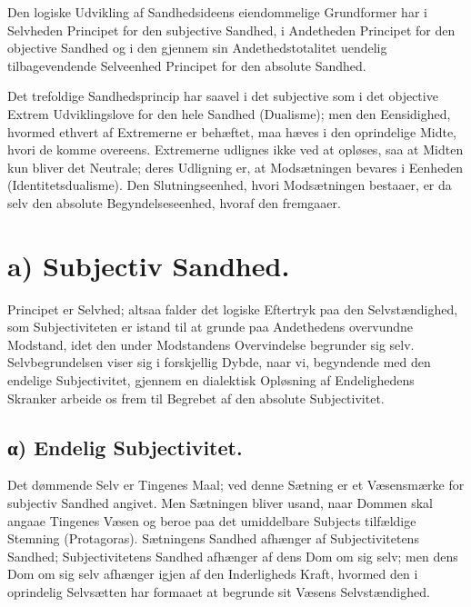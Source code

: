 \documentclass[12pt]{book}
\newcommand{\opage}[1]{\marginnote{\footnotesize\textit{[#1]}}}
\begin{document}
Den logiske Udvikling af Sandhedsideens eiendommelige Grundformer
har i Selvheden Principet for den subjective Sandhed, i Andetheden
Principet for den objective Sandhed
\opage{50} og i den gjennem sin Andethedstotalitet uendelig tilbagevendende
Selveenhed Principet for den absolute Sandhed.

Det trefoldige Sandhedsprincip har saavel i det subjective som i det
objective Extrem Udviklingslove for den hele Sandhed (Dualisme); men
den Eensidighed, hvormed ethvert af Extremerne er behæftet, maa
hæves i den oprindelige Midte, hvori de komme overeens. Extremerne
udlignes ikke ved at opløses, saa at Midten kun bliver det Neutrale;
deres Udligning er, at Modsætningen bevares i Eenheden
(Identitetsdualisme). Den Slutningseenhed, hvori Modsætningen
bestaaer, er da selv den absolute Begyndelseseenhed, hvoraf den
fremgaaer.

\section*{a) Subjectiv Sandhed.}

Principet er Selvhed; altsaa falder det logiske Eftertryk paa den
Selvstændighed, som Subjectiviteten er istand til at grunde paa
Andethedens overvundne Modstand, idet den under Modstandens
Overvindelse begrunder sig selv. Selvbegrundelsen viser sig i
forskjellig Dybde, naar vi, begyndende med den endelige
Subjectivitet, gjennem en dialektisk Opløsning af Endelighedens
Skranker arbeide os frem til Begrebet af den absolute Subjectivitet.

\subsection*{α) Endelig Subjectivitet.}

Det dømmende Selv er Tingenes Maal; ved denne Sætning er et
Væsensmærke for subjectiv Sandhed angivet. Men Sætningen bliver
usand, naar Dommen skal angaae Tingenes Væsen og beroe paa det
umiddelbare Subjects tilfældige Stemning (Protagoras). Sætningens
Sandhed afhænger af Subjectivitetens Sandhed; Subjectivitetens
Sandhed afhænger af dens Dom om sig selv; men dens Dom om sig selv
afhænger igjen af den Inderligheds Kraft, hvormed den i oprindelig
Selvsætten har formaaet at begrunde sit Væsens Selvstændighed.
\end{document}
